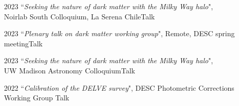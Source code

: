 \documentclass[11pt,letterpaper, sans]{moderncv}        %
\begin{document}
\begin{itemize}[itemsep=1pt, leftmargin=28pt]
    MiFA Colloquium, Minneapolis, MN\hfill Talk
    \item [2023] ``\textit{Seeking the nature of dark matter with the Milky Way halo}", \\
    Noirlab South Colloquium, La Serena Chile\hfill Talk
    \item [2023]``\textit{Plenary talk on dark matter working group}",
    Remote, DESC spring meeting\hfill Talk
    \item [2023] ``\textit{Seeking the nature of dark matter with the Milky Way halo}", \\
    UW Madison Astronomy Colloquium\hfill Talk
    \item [2022] ``\textit{Calibration of the DELVE survey}", DESC Photometric Corrections Working Group \hfill Talk
\end{itemize}
\end{document}
